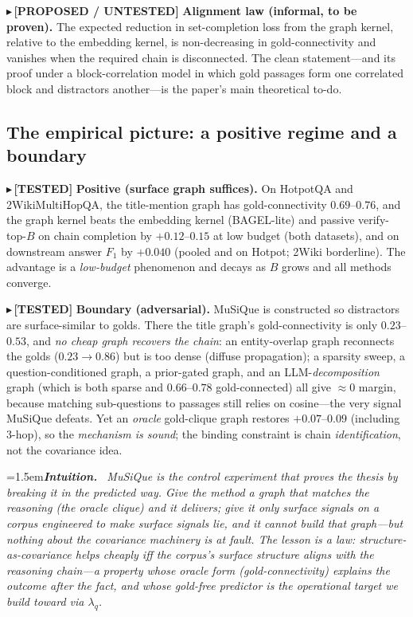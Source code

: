 \documentclass[11pt]{article}
\newcommand{\TESTED}[1]{{\color{teal}\small$\blacktriangleright$\,\textbf{[TESTED]} #1}}
\newcommand{\PROP}[1]{{\color{violet}\small$\blacktriangleright$\,\textbf{[PROPOSED / UNTESTED]} #1}}
\newenvironment{intuition}{\par\smallskip\noindent\hangindent=1.5em\textbf{\itshape Intuition.}\itshape\ \ignorespaces}{\par\smallskip}
\begin{document}
\PROP{\textbf{Alignment law (informal, to be proven).} The expected reduction in set-completion loss from the
graph kernel, relative to the embedding kernel, is non-decreasing in gold-connectivity and vanishes when the
required chain is disconnected. The clean statement---and its proof under a block-correlation model in which
gold passages form one correlated block and distractors another---is the paper's main theoretical to-do.}

\subsection{The empirical picture: a positive regime and a boundary}
\TESTED{\textbf{Positive (surface graph suffices).} On HotpotQA and 2WikiMultiHopQA, the title-mention graph
has gold-connectivity $0.69$--$0.76$, and the graph kernel beats the embedding kernel (BAGEL-lite) and passive
verify-top-$B$ on chain completion by $+0.12$--$0.15$ at low budget (both datasets), and on downstream answer
$F_1$ by $+0.040$ (pooled and on Hotpot; 2Wiki borderline). The advantage is a \emph{low-budget} phenomenon and
decays as $B$ grows and all methods converge.}

\TESTED{\textbf{Boundary (adversarial).} MuSiQue is constructed so distractors are surface-similar to golds. There
the title graph's gold-connectivity is only $0.23$--$0.53$, and \emph{no cheap graph recovers the chain}: an
entity-overlap graph reconnects the golds ($0.23\!\to\!0.86$) but is too dense (diffuse propagation); a
sparsity sweep, a question-conditioned graph, a prior-gated graph, and an LLM-\emph{decomposition} graph (which
is both sparse and $0.66$--$0.78$ gold-connected) all give $\approx0$ margin, because matching sub-questions to
passages still relies on cosine---the very signal MuSiQue defeats. Yet an \emph{oracle} gold-clique graph
restores $+0.07$--$0.09$ (including $3$-hop), so the \emph{mechanism is sound}; the binding constraint is chain
\emph{identification}, not the covariance idea.}

\begin{intuition}
MuSiQue is the control experiment that proves the thesis by breaking it in the predicted way. Give the method a
graph that matches the reasoning (the oracle clique) and it delivers; give it only surface signals on a corpus
engineered to make surface signals lie, and it cannot build that graph---but nothing about the covariance
machinery is at fault. The lesson is a \emph{law}: structure-as-covariance helps cheaply iff the corpus's
surface structure aligns with the reasoning chain---a property whose oracle form (gold-connectivity) explains
the outcome after the fact, and whose gold-free predictor is the operational target we build toward via
$\lambda_q$.
\end{intuition}
\end{document}
